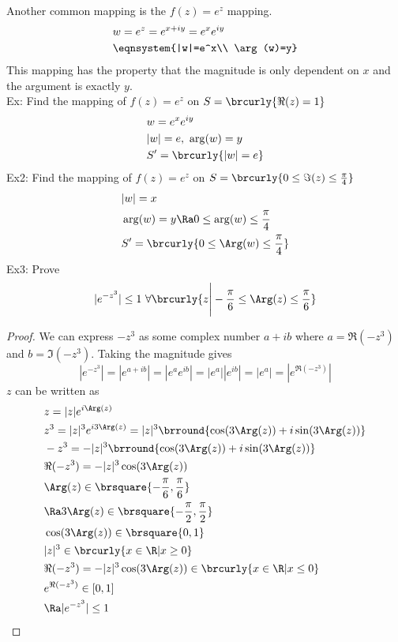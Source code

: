 Another common mapping is the $f(z)=e^z$ mapping.
\begin{align*}
    &w=e^z=e^{x+iy}=e^xe^{iy}\\
    &\eqnsystem{|w|=e^x\\ \arg(w)=y}
\end{align*}
This mapping has the property that the magnitude is only dependent on $x$ and the argument is exactly $y$.\\
Ex: Find the mapping of $f(z)=e^z$ on $S=\brcurly{\Re(z)=1}$
\begin{align*}
    &w=e^xe^{iy}\\
    &|w|=e,\ \arg(w)=y\\
    &S'=\brcurly{|w|=e}
\end{align*}
Ex2: Find the mapping of $f(z)=e^z$ on $S=\brcurly{0\leq \Im(z)\leq\frac{\pi}{4}}$
\begin{align*}
    &|w|=x\\
    &\arg(w)=y\Ra 0\leq \arg(w)\leq \frac{\pi}{4}\\
    &S'=\brcurly{0\leq \Arg(w)\leq \frac{\pi}{4}}
\end{align*}
Ex3: Prove 
\[ |e^{-z^3}|\leq 1\ \forall \brcurly{z\Bigg\vert-\frac{\pi}{6}\leq\Arg(z)\leq\frac{\pi}{6}} \]
\begin{proof}
We can express $-z^3$ as some complex number $a+ib$ where $a=\Re(-z^3)$ and $b=\Im(-z^3)$. Taking the magnitude gives
\[ |e^{-z^3}|=|e^{a+ib}|=|e^ae^{ib}|=|e^a||e^{ib}|=|e^a|=|e^{\Re(-z^3)}| \]
$z$ can be written as
\begin{align*}
    &z=|z|e^{i\Arg(z)}\\
    &z^3=|z|^3e^{i3\Arg(z)}=|z|^3\brround{\cos(3\Arg(z))+i\sin(3\Arg(z))}\\
    &-z^3=-|z|^3\brround{\cos(3\Arg(z))+i\sin(3\Arg(z))}\\
    &\Re(-z^3)=-|z|^3\cos(3\Arg(z))\\
    &\Arg(z)\in\brsquare{-\frac{\pi}{6},\frac{\pi}{6}}\\
    &\Ra 3\Arg(z)\in\brsquare{-\frac{\pi}{2},\frac{\pi}{2}}\\
    &\cos(3\Arg(z))\in\brsquare{0,1}\\
    &|z|^3\in\brcurly{x\in\R|x\geq0}\\
    &\Re(-z^3)=-|z|^3\cos(3\Arg(z))\in\brcurly{x\in\R|x\leq0}\\
    &e^{\Re(-z^3)}\in[0,1]\\
    &\Ra |e^{-z^3}|\leq1
\end{align*}
\end{proof}

